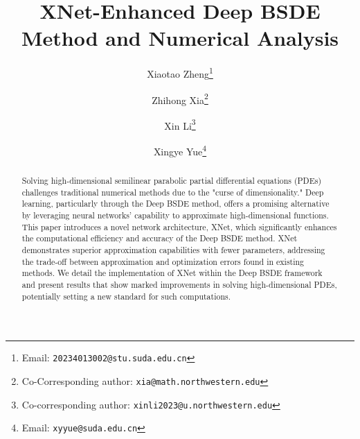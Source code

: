 \documentclass[11pt]{article}
\begin{document}
\title{\textbf{XNet-Enhanced Deep BSDE Method and Numerical Analysis}}
\author[1]{Xiaotao Zheng\thanks{Email: \texttt{20234013002@stu.suda.edu.cn}}}
\author[2,3]{Zhihong Xia\thanks{Co-Corresponding author: \texttt{xia@math.northwestern.edu}}}
\author[4,5]{Xin Li\thanks{Co-corresponding author: \texttt{xinli2023@u.northwestern.edu}}}
\author[6]{Xingye Yue\thanks{Email: \texttt{xyyue@suda.edu.cn}}}


\date{}

{}
\maketitle
	
{}

\begin{abstract}
Solving high-dimensional semilinear parabolic partial differential equations (PDEs) challenges traditional numerical methods due to the "curse of dimensionality." Deep learning, particularly through the Deep BSDE method, offers a promising alternative by leveraging neural networks' capability to approximate high-dimensional functions. This paper introduces a novel 
network architecture, XNet, which significantly enhances the computational efficiency and accuracy of the Deep BSDE method. XNet demonstrates superior approximation capabilities with fewer parameters, addressing the trade-off between approximation and optimization errors found in existing methods. We detail the implementation of XNet within the Deep BSDE framework and present results that show marked improvements in solving high-dimensional PDEs, potentially setting a new standard for such computations.	

\end{abstract}
\end{document}
